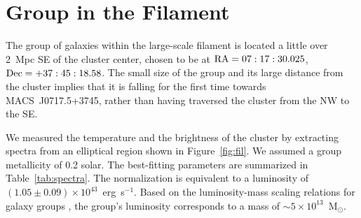 \section{Group in the Filament}
\label{sec:Group}

The group of galaxies within the large-scale filament is located a little over 2~Mpc SE of the cluster center, chosen to be at ${\rm RA} = 07:17:30.025$, ${\rm Dec} = +37:45:18.58$. The small size of the group and its large distance from the cluster implies that it is falling for the first time towards MACS~J0717.5+3745, rather than having traversed the cluster from the NW to the SE.

We measured the temperature and the brightness of the cluster by extracting spectra from an elliptical region shown in Figure~\ref{fig:fil}. We assumed a group metallicity of 0.2 solar. The best-fitting parameters are summarized in Table~\ref{tab:spectra}. The normalization is equivalent to a luminosity of $(1.05\pm 0.09) \times 10^{43}$~erg~s$^{-1}$. Based on the luminosity-mass scaling relations for galaxy groups \citep[e.g.,][]{Connor2014}, the group's luminosity corresponds to a mass of $\sim 5\times 10^{13}$~M$_\odot$.

